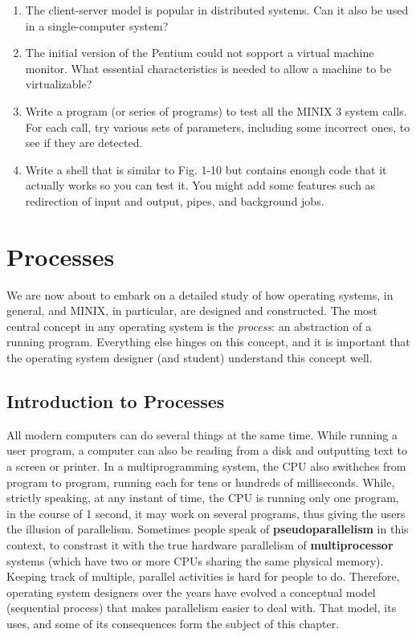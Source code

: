 \documentclass{book}
\newcommand {\kw}  [1] {\textbf{#1}}
\newcommand {\sys} [1] {\textsl{#1}}
\begin{document}
\begin{enumerate}
\item The client-server model is popular in distributed systems.
      Can it also be used in a single-computer system?
\item The initial version of the Pentium could not sopport a virtual machine monitor.
      What essential characteristics is needed to allow a machine to be virtualizable?
\item Write a program (or series of programs) to test all the MINIX 3 system calls.
      For each call, try various sets of parameters, including some incorrect ones, to see if they are detected.
\item Write a shell that is similar to Fig. 1-10 but contains enough code that it actually works so you can test it.
      You might add some features such as redirection of input and output, pipes, and background jobs.
\end{enumerate}


\chapter{Processes}
We are now about to embark on a detailed study of how operating systems, in general, and MINIX, in particular, are designed and constructed.
The most central concept in any operating system is the \sys{process}: an abstraction of a running program.
Everything else hinges on this concept, and it is important that the operating system designer (and student) understand this concept well.

\section{Introduction to Processes}
All modern computers can do several things at the same time.
While running a user program, a computer can also be reading from a disk and outputting text to a screen or printer.
In a multiprogramming system, the CPU also swithches from program to program, 
running each for tens or hundreds of milliseconds.
While, strictly speaking, at any instant of time, the CPU is running only one program, 
in the course of 1 second, it may work on several programs, thus giving the users the illusion of parallelism.
Sometimes people speak of \kw{pseudoparallelism} in this context, 
to constrast it with the true hardware parallelism of \kw{multiprocessor} systems (which have two or more CPUs sharing the same physical memory).
Keeping track of multiple, parallel activities is hard for people to do.
Therefore, operating system designers over the years have evolved a conceptual model (sequential process) 
that makes parallelism easier to deal with.
That model, its uses, and some of its consequences form the subject of this chapter.
\end{document}
